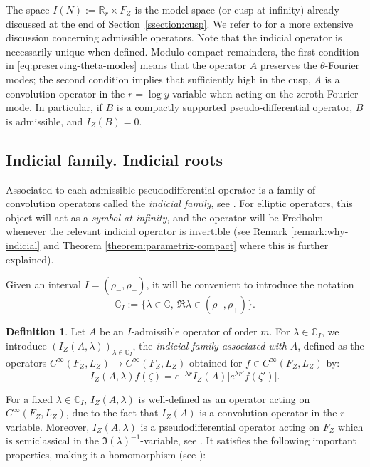 \documentclass[10pt]{amsart}
\newcommand{\C}{\mathbb{C}}
\newcommand{\R}{\mathbb{R}}
\theoremstyle{plain}
\theoremstyle{definition}
\newtheorem{definition}{Definition}[section]
\begin{document}
The space $I(N) := \R_r \times F_Z$ is the model space (or cusp at infinity) already discussed at the end of Section~\ref{ssection:cusp}. We refer to \cite[\S 4]{Bonthonneau-Lefeuvre-19-1} for a more extensive discussion concerning admissible operators. Note that the indicial operator is necessarily unique when defined. Modulo compact remainders, the first condition in \eqref{eq:preserving-theta-modes} means that the operator $A$ preserves the $\theta$-Fourier modes; the second condition implies that sufficiently high in the cusp, $A$ is a convolution operator in the $r=\log y$ variable when acting on the zeroth Fourier mode. In particular, if $B$ is a compactly supported pseudo-differential operator, $B$ is admissible, and $I_Z(B)=0$.

\subsection{Indicial family. Indicial roots}
\label{section:indicialfamily-indicialroots}

{\color{black}Associated to each admissible pseudodifferential operator is a family of convolution operators called the \emph{indicial family}, see \cite[\S 4.2.1]{Bonthonneau-Lefeuvre-19-1}. For elliptic operators, this object will act as a \emph{symbol at infinity}, and the operator will be Fredholm whenever the relevant indicial operator is invertible (see Remark \ref{remark:why-indicial} and Theorem \ref{theorem:parametrix-compact} where this is further explained).}

Given an interval $I=(\rho_-, \rho_+)$, it will be convenient to introduce the notation
\[
\C_{I}:= \{\lambda\in \C,\ \Re\lambda \in (\rho_-, \rho_+) \}.
\]

\begin{definition}
\label{definition:indicial-family}
Let $A$ be an $I$-admissible operator of order $m$. For $\lambda \in \C_I$, we introduce $(I_Z(A,\lambda))_{\lambda \in \C_I}$, the \emph{indicial family associated with $A$}, defined as the operators $C^\infty(F_Z,L_Z) \to C^\infty(F_Z,L_Z)$ obtained for $f \in C^\infty(F_Z,L_Z)$ by:
\begin{equation}
\label{equation:indicial-family}
I_Z(A,\lambda)f(\zeta) = e^{-\lambda r} I_Z(A)\bigl[ e^{\lambda r'}f(\zeta')\bigr].
\end{equation}
\end{definition}

For a fixed $\lambda \in \C_I$, $I_Z(A,\lambda)$ is well-defined as an operator acting on $C^\infty(F_Z,L_Z)$, due to the fact that $I_Z(A)$ is a convolution operator in the $r$-variable. Moreover, $I_Z(A,\lambda)$ is a pseudodifferential operator acting on $F_Z$ which is semiclassical in the $\Im(\lambda)^{-1}$-variable, see \cite[Lem.\,4.7]{Bonthonneau-Lefeuvre-19-1}. It satisfies the following important properties, making it a homomorphism (see \cite[Lem.\,4.8]{Bonthonneau-Lefeuvre-19-1}):
\end{document}
